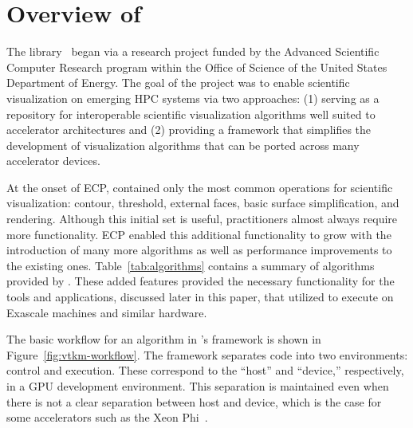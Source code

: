 \section{Overview of \vtkm}
\label{sec:overview}


The \vtkm library~\cite{Moreland2016} began via a research project funded
by the 
Advanced Scientific Computer Research program within the Office of Science of the
United States Department of Energy.
The goal of the project was to enable scientific visualization on emerging HPC systems via
two approaches:
(1) serving as a repository for interoperable scientific visualization algorithms well suited to accelerator architectures and (2) providing a framework that simplifies the development of visualization algorithms that can be ported across many accelerator devices.



At the onset of ECP, \vtkm contained only the most common operations for scientific visualization: contour, threshold, external faces, basic surface simplification, and rendering.
Although this initial set is useful, practitioners almost always require more functionality.
ECP enabled this additional functionality to grow with the introduction of many more algorithms as well as performance improvements to the existing ones.
Table~\ref{tab:algorithms} contains a summary of algorithms provided by \vtkm.
These added features provided the necessary functionality for the tools and applications, discussed later in this paper, that utilized \vtkm to execute on Exascale machines and similar hardware.


The basic workflow for an algorithm in \vtkm's framework is shown in Figure~\ref{fig:vtkm-workflow}.
The framework separates code into two environments: control and execution.
These correspond to the ``host'' and ``device,'' respectively, in a GPU development environment.
This separation is maintained even when 
there is not a clear separation between host and device, which is the case for some accelerators such as the Xeon Phi~\cite{Jeffers2016}.

